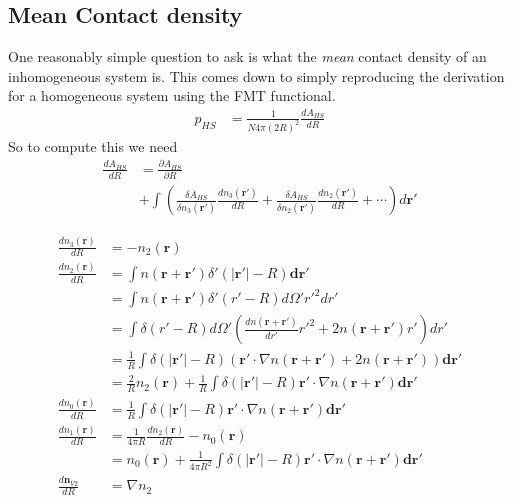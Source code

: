 \documentclass[letterpaper,twocolumn,amsmath,amssymb,prb]{revtex4-1}
\begin{document}
\begin{widetext}

\section{Mean Contact density}

One reasonably simple question to ask is what the \emph{mean} contact
density of an inhomogeneous system is.  This comes down to simply
reproducing the derivation for a homogeneous system using the
FMT functional.
\begin{align}
  p_{HS} &= \frac{1}{N 4\pi (2R)^2} \frac{dA_{HS}}{dR}
\end{align}
So to compute this we need
\begin{align}
  \frac{d A_{HS}}{d R} &=
  \frac{\partial A_{HS}}{\partial R} \\
  &+
  \int \left(
  \frac{\delta A_{HS}}{\delta n_3(\mathbf{r}')}
  \frac{d n_3(\mathbf{r}')}{d R}
  +
  \frac{\delta A_{HS}}{\delta n_2(\mathbf{r}')}
  \frac{d n_2(\mathbf{r}')}{d R}
  + \cdots
  \right) d\mathbf{r}'
\end{align}

\begin{align}
  \frac{dn_3(\mathbf{r})}{dR} &= -n_2(\mathbf{r})\\
  \frac{dn_2(\mathbf{r})}{dR} &= \int n(\mathbf{r}+\mathbf{r}')
  \delta'(|\mathbf{r'}| - R)\mathbf{dr}'\\
  &= \int n(\mathbf{r}+\mathbf{r}')
  \delta'(r' - R) d\Omega' r'^2 dr'\\
  &= \int 
  \delta(r' - R) d\Omega' \left(\frac{dn(\mathbf{r}+\mathbf{r}')}{dr'}r'^2 + 2n(\mathbf{r}+\mathbf{r}')r' \right) dr'\\
  &= \frac1{R} \int 
  \delta(|\mathbf{r}'| - R)
  \left(\mathbf{r}'\cdot \nabla n(\mathbf{r}+\mathbf{r}') +
  2n(\mathbf{r}+\mathbf{r}') \right) \mathbf{dr}' \\
  &= \frac{2}{R}n_2(\mathbf{r}) + \frac{1}{R} \int 
  \delta(|\mathbf{r}'| - R)\mathbf{r}'\cdot \nabla n(\mathbf{r}+\mathbf{r}') \mathbf{dr}' \\
  \frac{dn_0(\mathbf{r})}{dR} &= \frac{1}{R} \int 
  \delta(|\mathbf{r}'| - R)\mathbf{r}'\cdot \nabla n(\mathbf{r}+\mathbf{r}') \mathbf{dr}' \\
  \frac{dn_1(\mathbf{r})}{dR} &=
    \frac1{4\pi R}\frac{dn_2(\mathbf{r})}{dR} - n_0(\mathbf{r}) \\
    &= n_0(\mathbf{r}) + \frac{1}{4\pi R^2} \int 
    \delta(|\mathbf{r}'| - R)\mathbf{r}'\cdot \nabla n(\mathbf{r}+\mathbf{r}') \mathbf{dr}' \\
  \frac{d\mathbf{n}_{V2}}{dR} &= \nabla n_2
\end{align}


\end{widetext}
\end{document}

